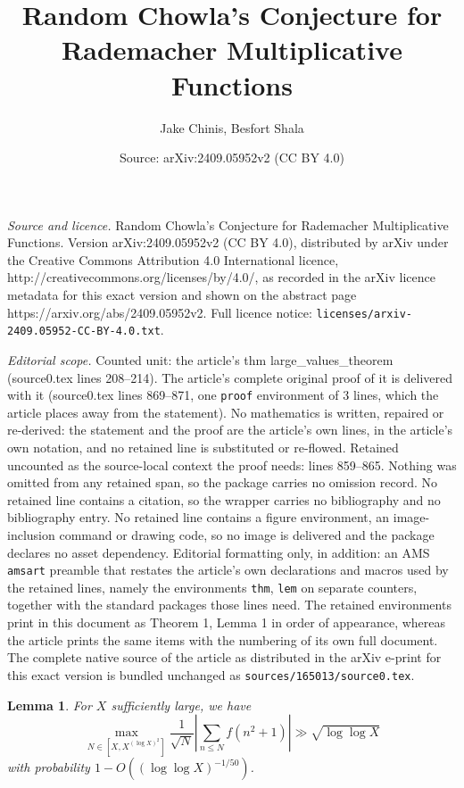 \documentclass[10pt,a4paper]{amsart}
\title{Random Chowla's Conjecture for Rademacher Multiplicative Functions}
\author{Jake Chinis, Besfort Shala}
\date{Source: arXiv:2409.05952v2 (CC BY 4.0)}
\newtheorem{lem}{Lemma}
\begin{document}
\maketitle

\noindent\emph{Source and licence.} Random Chowla's Conjecture for Rademacher Multiplicative Functions. Version arXiv:2409.05952v2 (CC BY 4.0), distributed by arXiv under the Creative Commons Attribution 4.0 International licence, http://creativecommons.org/licenses/by/4.0/, as recorded in the arXiv licence metadata for this exact version and shown on the abstract page https://arxiv.org/abs/2409.05952v2. Full licence notice: \texttt{licenses/arxiv-2409.05952-CC-BY-4.0.txt}.\par\smallskip

\noindent\textit{Editorial scope.} Counted unit: the article's thm large\_values\_theorem (source0.tex lines 208--214). The article's complete original proof of it is delivered with it (source0.tex lines 869--871, one \texttt{proof} environment of 3 lines, which the article places away from the statement). No mathematics is written, repaired or re-derived: the statement and the proof are the article's own lines, in the article's own notation, and no retained line is substituted or re-flowed.  Retained uncounted as the source-local context the proof needs: lines 859--865.  Nothing was omitted from any retained span, so the package carries no omission record.  No retained line contains a citation, so the wrapper carries no bibliography and no bibliography entry.  No retained line contains a figure environment, an image-inclusion command or drawing code, so no image is delivered and the package declares no asset dependency.  Editorial formatting only, in addition: an AMS \texttt{amsart} preamble that restates the article's own declarations and macros used by the retained lines, namely the environments \texttt{thm}, \texttt{lem} on separate counters, together with the standard packages those lines need.  The retained environments print in this document as Theorem 1, Lemma 1 in order of appearance, whereas the article prints the same items with the numbering of its own full document.  The complete native source of the article as distributed in the arXiv e-print for this exact version is bundled unchanged as \texttt{sources/165013/source0.tex}.
\begin{lem}\label{large_values_lemma}
For $X$ sufficiently large, we have 
\begin{equation}
    \max_{N\in [X, X^{(\log X)^2}]} \frac{1}{\sqrt N}\left\lvert\sum_{n\leq N} f(n^2 + 1)\right\rvert \gg \sqrt{\log\log X}\label{local_large_val}
\end{equation}
with probability $1 - O((\log\log X)^{-1/50})$.
\end{lem}
\end{document}
